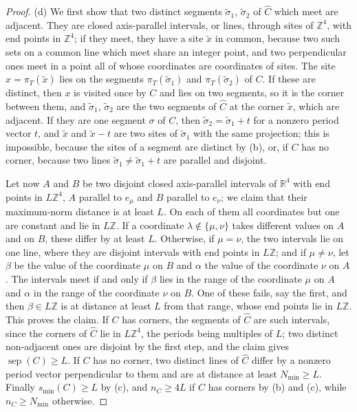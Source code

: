 \documentclass[11pt]{article}
\newcommand{\sep}{\operatorname{sep}}
\numberwithin{equation}{section}
\theoremstyle{remark}
\theoremstyle{plain}
\begin{document}
\begin{proof}
(d) We first show that two distinct segments $\tilde\sigma_1$, $\tilde\sigma_2$ of $\widehat C$ which meet are adjacent. They are closed axis-parallel intervals, or lines, through sites of $\mathbb Z^4$, with end points in $\mathbb Z^4$; if they meet, they have a site $\tilde x$ in common, because two such sets on a common line which meet share an integer point, and two perpendicular ones meet in a point all of whose coordinates are coordinates of sites. The site $x=\pi_T(\tilde x)$ lies on the segments $\pi_T(\tilde\sigma_1)$ and $\pi_T(\tilde\sigma_2)$ of $C$. If these are distinct, then $x$ is visited once by $C$ and lies on two segments, so it is the corner between them, and $\tilde\sigma_1$, $\tilde\sigma_2$ are the two segments of $\widehat C$ at the corner $\tilde x$, which are adjacent. If they are one segment $\sigma$ of $C$, then $\tilde\sigma_2=\tilde\sigma_1+t$ for a nonzero period vector $t$, and $\tilde x$ and $\tilde x-t$ are two sites of $\tilde\sigma_1$ with the same projection; this is impossible, because the sites of a segment are distinct by (b), or, if $C$ has no corner, because two lines $\tilde\sigma_1\neq\tilde\sigma_1+t$ are parallel and disjoint.

Let now $A$ and $B$ be two disjoint closed axis-parallel intervals of $\mathbb R^4$ with end points in $L\mathbb Z^4$, $A$ parallel to $e_{\mu}$ and $B$ parallel to $e_{\nu}$; we claim that their maximum-norm distance is at least $L$. On each of them all coordinates but one are constant and lie in $L\mathbb Z$. If a coordinate $\lambda\notin\{\mu,\nu\}$ takes different values on $A$ and on $B$, these differ by at least $L$. Otherwise, if $\mu=\nu$, the two intervals lie on one line, where they are disjoint intervals with end points in $L\mathbb Z$; and if $\mu\neq\nu$, let $\beta$ be the value of the coordinate $\mu$ on $B$ and $\alpha$ the value of the coordinate $\nu$ on $A$. The intervals meet if and only if $\beta$ lies in the range of the coordinate $\mu$ on $A$ and $\alpha$ in the range of the coordinate $\nu$ on $B$. One of these fails, say the first, and then $\beta\in L\mathbb Z$ is at distance at least $L$ from that range, whose end points lie in $L\mathbb Z$. This proves the claim. If $C$ has corners, the segments of $\widehat C$ are such intervals, since the corners of $\widehat C$ lie in $L\mathbb Z^4$, the periods being multiples of $L$; two distinct non-adjacent ones are disjoint by the first step, and the claim gives $\sep(C)\geqslant L$. If $C$ has no corner, two distinct lines of $\widehat C$ differ by a nonzero period vector perpendicular to them and are at distance at least $N_{\min}\geqslant L$. Finally $s_{\min}(C)\geqslant L$ by (c), and $n_C\geqslant 4L$ if $C$ has corners by (b) and (c), while $n_C\geqslant N_{\min}$ otherwise.
\end{proof}
\end{document}
